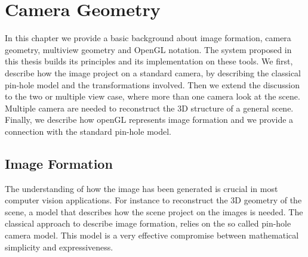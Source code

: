 \chapter{Camera Geometry}
\label{ch:camera}
In this chapter we provide a basic background about image formation, camera geometry, multiview geometry and OpenGL notation. 
The system proposed in this thesis builds its principles and its implementation on these tools. 
We first, describe how the image project on a standard camera, by describing the classical pin-hole model and the transformations involved. 
Then we extend the discussion to the two or multiple view case, where more than one camera look at the scene. Multiple camera are needed to reconstruct the 3D structure of a general scene.
Finally, we describe how openGL represents image formation and we provide a connection with the standard pin-hole model.


\minitoc
\newpage

\section{Image Formation}
The understanding of how the image has been generated is crucial in most computer vision applications. For instance to reconstruct the 3D geometry of the scene, a model that describes how the scene project on the images is needed. 
The classical approach to describe image formation, relies on the so called pin-hole camera model.
This model is a very effective compromise between mathematical simplicity and expressiveness.

